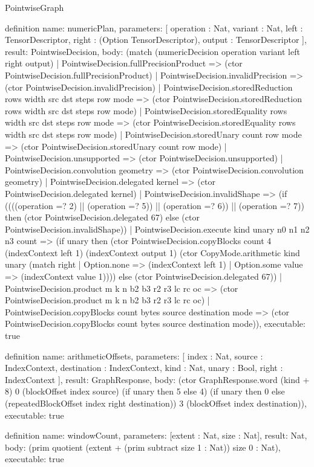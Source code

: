 \begin{lexlean}{PointwiseGraph}
\begin{semanticmodule}
definition{
  name: numericPlan,
  parameters: [
    operation : Nat,
    variant : Nat,
    left : TensorDescriptor,
    right : (Option TensorDescriptor),
    output : TensorDescriptor
  ],
  result: PointwiseDecision,
  body: (match (numericDecision operation variant left right output)
    | PointwiseDecision.fullPrecisionProduct => (ctor PointwiseDecision.fullPrecisionProduct)
    | PointwiseDecision.invalidPrecision => (ctor PointwiseDecision.invalidPrecision)
    | PointwiseDecision.storedReduction rows width src dst steps row mode => (ctor PointwiseDecision.storedReduction rows width src dst steps row mode)
    | PointwiseDecision.storedEquality rows width src dst steps row mode => (ctor PointwiseDecision.storedEquality rows width src dst steps row mode)
    | PointwiseDecision.storedUnary count row mode => (ctor PointwiseDecision.storedUnary count row mode)
    | PointwiseDecision.unsupported => (ctor PointwiseDecision.unsupported)
    | PointwiseDecision.convolution geometry => (ctor PointwiseDecision.convolution geometry)
    | PointwiseDecision.delegated kernel => (ctor PointwiseDecision.delegated kernel)
    | PointwiseDecision.invalidShape => (if ((((operation =? 2) || (operation =? 5)) || (operation =? 6)) || (operation =? 7)) then (ctor PointwiseDecision.delegated 67) else (ctor PointwiseDecision.invalidShape))
    | PointwiseDecision.execute kind unary n0 n1 n2 n3 count => (if unary then (ctor PointwiseDecision.copyBlocks count 4 (indexContext left 1) (indexContext output 1) (ctor CopyMode.arithmetic kind unary (match right
      | Option.none => (indexContext left 1)
      | Option.some value => (indexContext value 1)))) else (ctor PointwiseDecision.delegated 67))
    | PointwiseDecision.product m k n b2 b3 r2 r3 lc rc oc => (ctor PointwiseDecision.product m k n b2 b3 r2 r3 lc rc oc)
    | PointwiseDecision.copyBlocks count bytes source destination mode => (ctor PointwiseDecision.copyBlocks count bytes source destination mode)),
  executable: true
}

definition{
  name: arithmeticOffsets,
  parameters: [
    index : Nat,
    source : IndexContext,
    destination : IndexContext,
    kind : Nat,
    unary : Bool,
    right : IndexContext
  ],
  result: GraphResponse,
  body: (ctor GraphResponse.word (kind + 8) 0 (blockOffset index source) (if unary then 5 else 4) (if unary then 0 else (repeatedBlockOffset index right destination)) 3 (blockOffset index destination)),
  executable: true
}

definition{
  name: windowCount,
  parameters: [extent : Nat, size : Nat],
  result: Nat,
  body: (prim quotient (extent + (prim subtract size 1 : Nat)) size 0 : Nat),
  executable: true
}


\end{semanticmodule}
\end{lexlean}
